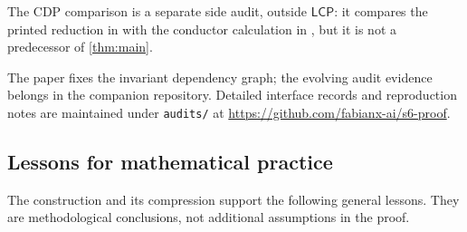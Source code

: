 \documentclass[11pt,reqno]{amsart}
\numberwithin{equation}{section}
\newcommand{\LCP}{\mathsf{LCP}}
\theoremstyle{definition}
\begin{document}
The CDP comparison is a separate side audit, outside $\LCP$: it compares the printed reduction in \cite[\S7]{CDP20} with the conductor calculation in \cite[\S10]{S6}, but it is not a predecessor of \cref{thm:main}.

The paper fixes the invariant dependency graph; the evolving audit evidence belongs in the companion repository. Detailed interface records and reproduction notes are maintained under \texttt{audits/} at \url{https://github.com/fabianx-ai/s6-proof}.

\subsection{Lessons for mathematical practice}\label{sec:lessons}

The construction and its compression support the following general lessons. They are methodological conclusions, not additional assumptions in the proof.
\end{document}
